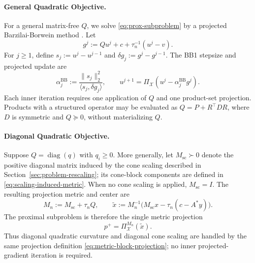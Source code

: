 \documentclass[letterpaper]{article} %
\theoremstyle{definition}
\theoremstyle{remark}
\begin{document}
\paragraph{General Quadratic Objective.}

For a general matrix-free $Q$, we solve \eqref{eq:prox-subproblem} by a
projected Barzilai-Borwein method \cite{dai2005projected}. Let
\begin{equation}
\label{eq:bb-inner-gradient}
    g^j
    :=Qu^j+c+\tau_n^{-1}(u^j-v).
\end{equation}
For $j\ge1$, define $s_j:=u^j-u^{j-1}$ and
$\delta g_j:=g^j-g^{j-1}$. The BB1 stepsize and projected update are
\begin{equation}
\label{eq:bb-step}
    \alpha_j^{\mathrm{BB}}
    :=\frac{\|s_j\|_2^2}{\langle s_j,\delta g_j\rangle},
    \qquad
    u^{j+1}
    =\Pi_{\mathcal X}\left(u^j-\alpha_j^{\mathrm{BB}}g^j\right).
\end{equation}
Each inner iteration requires one application of $Q$ and one product-set
projection. Products with a structured operator may be evaluated as
$Q=P+R^\top D R$, where $D$ is symmetric and $Q\succeq0$, without
materializing $Q$.

\paragraph{Diagonal Quadratic Objective.}

Suppose $Q=\operatorname{diag}(q)$ with $q_i\ge0$. More generally, let
$M_{\mathrm{sc}}\succ0$ denote the positive diagonal matrix induced by the
cone scaling described in Section~\ref{sec:problem-rescaling}; its cone-block
components are defined in \eqref{eq:scaling-induced-metric}.
When no cone scaling is applied, $M_{\mathrm{sc}}=I$. The resulting projection
metric and center are
\begin{equation}
\label{eq:diagonal-q-metric}
    M_n:=M_{\mathrm{sc}}+\tau_nQ,
    \qquad
    \widetilde x
    :=M_n^{-1}\bigl(M_{\mathrm{sc}}x-\tau_n(c-A^*y)\bigr).
\end{equation}
The proximal subproblem is therefore the single metric projection
\begin{equation}
\label{eq:diagonal-q-metric-projection}
    p^+=\Pi_{\mathcal X}^{M_n}(\widetilde x).
\end{equation}
Thus diagonal quadratic curvature and diagonal cone scaling are handled
by the same projection definition \eqref{eq:metric-block-projection}; no inner
projected-gradient iteration is required.
\end{document}
